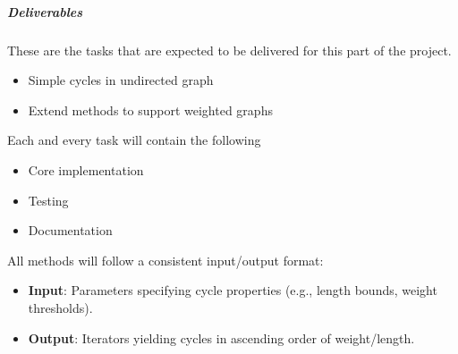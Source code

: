 \subparagraph{Deliverables}
These are the tasks that are expected to be delivered for this part of the
project.

\begin{itemize}
    \item Simple cycles in undirected graph
    \item Extend methods to support weighted graphs
\end{itemize}

Each and every task will contain the following

\begin{itemize}
    \item Core implementation
    \item Testing
    \item Documentation
\end{itemize}

All methods will follow a consistent input/output format:
\begin{itemize}
    \item \textbf{Input}: Parameters specifying cycle properties (e.g., length bounds, weight thresholds).
    \item \textbf{Output}: Iterators yielding cycles in ascending order of weight/length.
\end{itemize}


